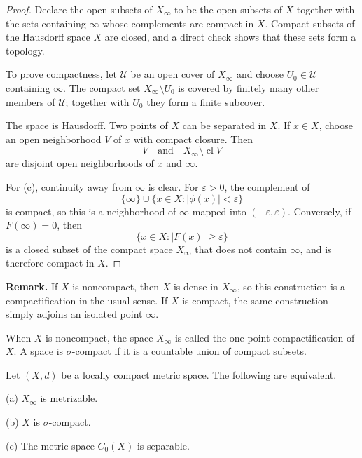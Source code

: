 \begin{proof}
Declare the open subsets of $X_\infty$ to be the open subsets of $X$ together
with the sets containing $\infty$ whose complements are compact in $X$.
Compact subsets of the Hausdorff space $X$ are closed, and a direct check
shows that these sets form a topology.

To prove compactness, let $\mathcal{U}$ be an open cover of $X_\infty$ and
choose $U_0\in\mathcal{U}$ containing $\infty$. The compact set
$X_\infty\setminus U_0$ is covered by finitely many other members of
$\mathcal{U}$; together with $U_0$ they form a finite subcover.

The space is Hausdorff. Two points of $X$ can be separated in $X$. If $x\in X$,
choose an open neighborhood $V$ of $x$ with compact closure. Then
\[
V
\quad\text{and}\quad
X_\infty\setminus\operatorname{cl}V
\]
are disjoint open neighborhoods of $x$ and $\infty$.

For (c), continuity away from $\infty$ is clear. For $\varepsilon>0$, the
complement of
\[
\{\infty\}\cup\{x\in X:|\phi(x)|<\varepsilon\}
\]
is compact, so this is a neighborhood of $\infty$ mapped into
$(-\varepsilon,\varepsilon)$. Conversely, if $F(\infty)=0$, then
\[
\{x\in X:|F(x)|\geq\varepsilon\}
\]
is a closed subset of the compact space $X_\infty$ that does not contain
$\infty$, and is therefore compact in $X$.
\end{proof}

\medskip
\noindent\textbf{Remark.}
If $X$ is noncompact, then $X$ is dense in $X_\infty$, so this construction
is a compactification in the usual sense. If $X$ is compact, the same
construction simply adjoins an isolated point $\infty$.
\medskip
\begin{de}
When $X$ is noncompact, the space $X_\infty$ is called the one-point
compactification of $X$.
A space is $\sigma$-compact if it is a countable union of compact subsets.
\end{de}

\begin{thm}
Let $(X,d)$ be a locally compact metric space. The following are equivalent.

(a) $X_\infty$ is metrizable.

(b) $X$ is $\sigma$-compact.

(c) The metric space $C_0(X)$ is separable.
\end{thm}

